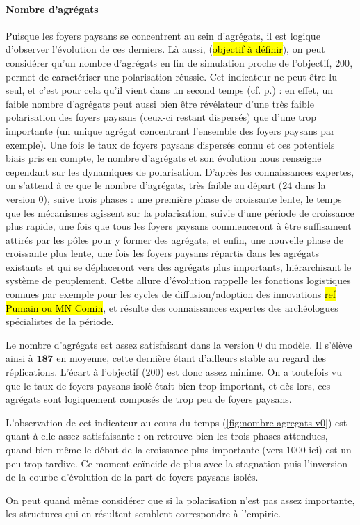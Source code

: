 \paragraph{Nombre d'agrégats}

Puisque les foyers paysans se concentrent au sein d'agrégats, il est logique d'observer l'évolution de ces derniers.
Là aussi, (\hl{objectif à définir}), on peut considérer qu'un nombre d'agrégats en fin de simulation proche de l'objectif, $200$, permet de caractériser une polarisation réussie.
Cet indicateur ne peut être lu seul, et c'est pour cela qu'il vient dans un second temps (cf. p.\pageref{par:hierarchie_interne}) :
en effet, un faible nombre d'agrégats peut aussi bien être révélateur d'une très faible polarisation des foyers paysans (ceux-ci restant dispersés) que d'une trop importante (un unique agrégat concentrant l'ensemble des foyers paysans par exemple).
Une fois le taux de foyers paysans dispersés connu et ces potentiels biais pris en compte, le nombre d'agrégats et son évolution nous renseigne cependant sur les dynamiques de polarisation.
D'après les connaissances expertes, on s'attend à ce que le nombre d'agrégats, très faible au départ (24 dans la version 0), suive trois phases :
une première phase de croissante lente, le temps que les mécanismes agissent sur la polarisation, suivie d'une période de croissance plus rapide, une fois que tous les foyers paysans commenceront à être suffisament attirés par les pôles pour y former des agrégats, et enfin, une nouvelle phase de croissante plus lente, une fois les foyers paysans répartis dans les agrégats existants et qui se déplaceront vers des agrégats plus importants, hiérarchisant le système de peuplement.
Cette allure d'évolution rappelle les fonctions logistiques connues par exemple pour les cycles de diffusion/adoption des innovations \hl{ref Pumain ou MN Comin}, et résulte des connaissances expertes des archéologues spécialistes de la période.

\begin{mdframed}[backgroundcolor=gray!10,footnoteinside=false]
	Le nombre d'agrégats est assez satisfaisant dans la version 0 du modèle.
Il s'élève ainsi à $\textbf{187}$ en moyenne, cette dernière étant d'ailleurs stable au regard des réplications.
L'écart à l'objectif ($200$) est donc assez minime.
On a toutefois vu que le taux de foyers paysans isolé était bien trop important, et dès lors, ces agrégats sont logiquement composés de trop peu de foyers paysans.
	
	L'observation de cet indicateur au cours du temps (\cref{fig:nombre-agregats-v0}) est quant à elle assez satisfaisante :
on retrouve bien les trois phases attendues, quand bien même le début de la croissance plus importante (vers 1000 ici) est un peu trop tardive.
Ce moment coïncide de plus avec la stagnation puis l'inversion de la courbe d'évolution de la part de foyers paysans isolés.
	
	On peut quand même considérer que si la polarisation n'est pas assez importante, les structures qui en résultent semblent correspondre à l'empirie.
\end{mdframed}

